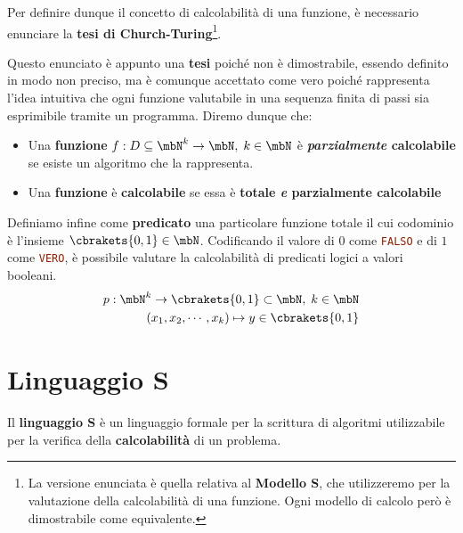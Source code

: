 Per definire dunque il concetto di calcolabilità di una funzione, è necessario enunciare la \textbf{tesi di Church-Turing}\footnote{La versione enunciata è quella relativa al \textbf{Modello S}, che utilizzeremo per la valutazione della calcolabilità di una funzione. Ogni modello di calcolo però è dimostrabile come equivalente.}.

Questo enunciato è appunto una \textbf{tesi} poiché non è dimostrabile, essendo definito in modo non preciso, ma è comunque accettato come vero poiché rappresenta l'idea intuitiva che ogni funzione valutabile in una sequenza finita di passi sia esprimibile tramite un programma.
Diremo dunque che:

\begin{itemize}
  \item Una \textbf{funzione} \(f: D\subseteq\mbN^k\rightarrow\mbN,\; k\in\mbN\) è \textbf{\textit{parzialmente} calcolabile} se esiste un algoritmo che la rappresenta.
  \item Una \textbf{funzione} è \textbf{calcolabile} se essa è \textbf{totale \textit{e} parzialmente calcolabile}
\end{itemize}

Definiamo infine come \textbf{predicato} una particolare funzione totale il cui codominio è l'insieme \(\cbrakets{0,1}\in\mbN\). Codificando il valore di \(0\) come \lstinline[language=ini]{FALSO} e di \(1\) come \lstinline[language=ini]{VERO}, è possibile valutare la calcolabilità di predicati logici a valori booleani.
\begin{equation}
  \begin{split}
    p: \mbN^k\rightarrow\cbrakets{0,1}\subset\mbN,\; k\in\mbN\\
    (x_1,x_2,\cdots,x_k)\mapsto y\in\cbrakets{0,1}
    \end{split}
    \label{Predicato Eq}
\end{equation}

\newpage

\section{Linguaggio S}

Il \textbf{linguaggio S} è un linguaggio formale per la scrittura di algoritmi utilizzabile per la verifica della \textbf{calcolabilità} di un problema.

